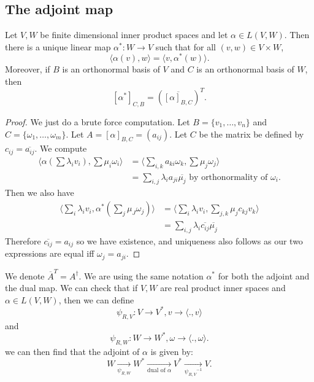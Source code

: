 \documentclass[a4paper]{scrartcl}
\begin{document}
\subsection{The adjoint map}
\begin{definition}
      Let $V,W$ be finite dimensional inner product spaces and let $\alpha \in L (V,W)$. Then there is a unique linear map $\alpha^* : W \rightarrow V$ such that for all $(v,w) \in V \times W$, 
      \[\langle \alpha (v),w \rangle =\langle v,\alpha^* (w) \rangle .\]
      Moreover, if $B$ is an orthonormal basis of $V$ and $C$ is an orthonormal basis of $W$, then 
      \[[\alpha^*]_{C,B}=(\overline{[\alpha]_{B,C}} )^T.\]
\end{definition}
\begin{proof}
      We just do a brute force computation. Let $B =\{v_1, \ldots , v_n \} $ and $C= \{ \omega_1, \ldots , \omega_m\}$. Let $A=[\alpha]_{B,C}=(a_{ij})$. Let $C$ be the matrix be defined by $c_{ij}=\overline{a_{ij}} $. We compute 
      \begin{align*}
          \langle \alpha (\sum \lambda_i v_i), \sum \mu_i \omega_i \rangle &=\langle \sum_{i,k} a_{ki} \omega_k, \sum \mu_j \omega_j  \rangle \\
          &=\sum_{i,j} \lambda_i a_{ji} \overline{\mu_j} \text{ by orthonormality of } \omega_i.
      \end{align*}
      Then we also have 
      \begin{align*}
           \langle \sum_{i} \lambda_i v_i, \alpha^* \left( \sum_j \mu_J \omega_j \right) \rangle &=\langle \sum_{i} \lambda_i v_i, \sum_{j,k} \mu_j c_{kj}v_k \rangle \\&= \sum_{i,j}\lambda_i \overline{c_{ij}} \overline{\mu_j} 
      \end{align*}
      Therefore $\overline{c_{ij}} = a_{ij}$ so we have existence, and uniqueness also follows as our two expressions are equal iff $\omega_j=a_{ji}$.  
\end{proof}
\begin{remark}
      We denote $\overline{A} ^T=A^\dagger$. We are using the same notation $\alpha^*$ for both the adjoint and the dual map. We can check that if $V,W$ are real product inner spaces and $\alpha \in L (V,W)$, then we can define 
      \[\psi_{R,V}: V \rightarrow V^{*}, v \rightarrow \langle .,v \rangle\]
      and 
      \[\psi_{R,W}: W \rightarrow W^{*}, \omega \rightarrow \langle .,\omega \rangle.\]
      we can then find that the adjoint of $\alpha$ is given by: 
      \[W \underset{\psi_{R,W}}{\rightarrow }W^* \underset{\text{dual of } \alpha}{\rightarrow }V^* \underset{{\psi_{R,V}}^{-1}}{\rightarrow }V.\]
\end{remark}
\end{document}
